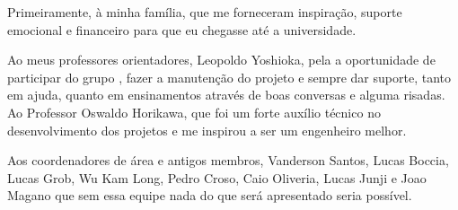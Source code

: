 \documentclass[]{politex}
\begin{document}
\capa
\falsafolhaderosto
\folhaderosto





\begin{agradecimentos}

Primeiramente, à minha família, que me forneceram inspiração, suporte emocional e financeiro para que eu chegasse até a universidade.

Ao meus professores orientadores, Leopoldo Yoshioka, pela a oportunidade de participar do grupo , fazer a manutenção do projeto e sempre dar suporte, tanto em ajuda, quanto em ensinamentos através de boas conversas e alguma risadas. Ao Professor Oswaldo Horikawa, que foi um forte auxílio técnico no desenvolvimento dos projetos e me inspirou a ser um engenheiro melhor.

Aos coordenadores de área e antigos membros, Vanderson Santos, Lucas Boccia, Lucas Grob, Wu Kam Long, Pedro Croso, Caio Oliveria, Lucas Junji e Joao Magano que sem essa equipe nada do que será apresentado seria possível.


\end{agradecimentos}

\end{document}
